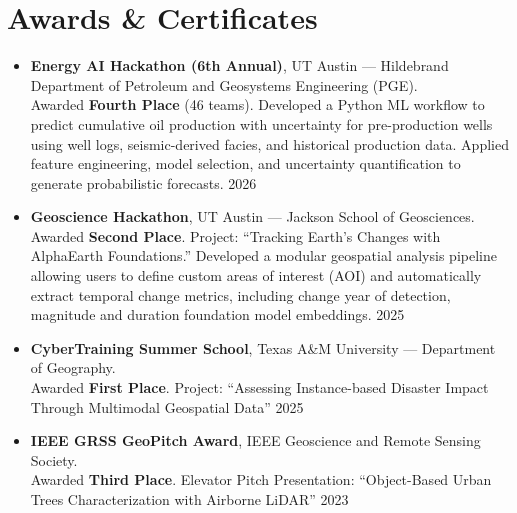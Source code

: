 \documentclass[a4paper,12pt]{article}
\makeatletter
\newenvironment{joblong}[2]
{
\begin{tabularx}{\linewidth}{@{}l X r@{}}
\textbf{#1} & \hfill &  #2 \\[3.75pt]
\end{tabularx}
\begin{minipage}[t]{\linewidth}
\begin{itemize}[nosep,after=\strut,leftmargin=1.2em,itemsep=3pt,label=--]
}
{
\end{itemize}
\end{minipage}
}
\makeatother
\begin{document}
\section{Awards \& Certificates}

\begin{itemize}[leftmargin=1.5em, itemsep=4pt, label=--]

    \item \textbf{Energy AI Hackathon (6th Annual)}, UT Austin — Hildebrand Department of Petroleum and Geosystems Engineering (PGE). \\
    Awarded \textbf{Fourth Place} (46 teams). Developed a Python ML workflow to predict cumulative oil production with uncertainty for pre-production wells using well logs, seismic-derived facies, and historical production data. Applied feature engineering, model selection, and uncertainty quantification to generate probabilistic forecasts. \hfill 2026

    \item \textbf{Geoscience Hackathon}, UT Austin — Jackson School of Geosciences. \\
    Awarded \textbf{Second Place}. Project: ``Tracking Earth's Changes with AlphaEarth Foundations.'' Developed a modular geospatial analysis pipeline allowing users to define custom areas of interest (AOI) and automatically extract temporal change metrics, including change year of detection, magnitude and duration foundation model embeddings. \hfill 2025

    \item \textbf{CyberTraining Summer School}, Texas A\&M University — Department of Geography. \\
    Awarded \textbf{First Place}. Project: ``Assessing Instance-based Disaster Impact Through Multimodal Geospatial Data''  \hfill 2025

    \item \textbf{IEEE GRSS GeoPitch Award}, IEEE Geoscience and Remote Sensing Society. \\
    Awarded \textbf{Third Place}. Elevator Pitch Presentation: ``Object-Based Urban Trees Characterization with Airborne LiDAR'' \hfill 2023

\end{itemize}
\end{document}
